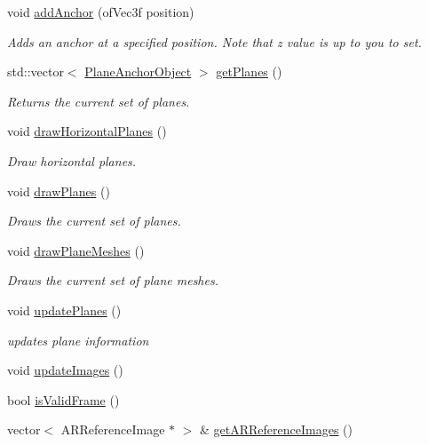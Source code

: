 \begin{DoxyCompactItemize}
void \mbox{\hyperlink{class_a_r_processor_af4e627093ee86883736c89c2a627af42}{add\+Anchor}} (of\+Vec3f position)
\begin{DoxyCompactList}\small\item\em Adds an anchor at a specified position. Note that z value is up to you to set. \end{DoxyCompactList}\item 
std\+::vector$<$ \mbox{\hyperlink{struct_a_r_objects_1_1_plane_anchor_object}{Plane\+Anchor\+Object}} $>$ \mbox{\hyperlink{class_a_r_processor_a7989d984ccedbb31b0299adfe1fb1ac4}{get\+Planes}} ()
\begin{DoxyCompactList}\small\item\em Returns the current set of planes. \end{DoxyCompactList}\item 
void \mbox{\hyperlink{class_a_r_processor_a6a61a7e03821410bc1a715fd32159662}{draw\+Horizontal\+Planes}} ()
\begin{DoxyCompactList}\small\item\em Draw horizontal planes. \end{DoxyCompactList}\item 
void \mbox{\hyperlink{class_a_r_processor_acb7b24b21a47b4f4aa9d4d2c07a60d56}{draw\+Planes}} ()
\begin{DoxyCompactList}\small\item\em Draws the current set of planes. \end{DoxyCompactList}\item 
void \mbox{\hyperlink{class_a_r_processor_a516f256cd561a6f572f8741a2dec9c25}{draw\+Plane\+Meshes}} ()
\begin{DoxyCompactList}\small\item\em Draws the current set of plane meshes. \end{DoxyCompactList}\item 
void \mbox{\hyperlink{class_a_r_processor_aaa1488d9082ec598fd4aeb5c5c43d999}{update\+Planes}} ()
\begin{DoxyCompactList}\small\item\em updates plane information \end{DoxyCompactList}\item 
void \mbox{\hyperlink{class_a_r_processor_a287729321790fb840cb27a49e65f68a8}{update\+Images}} ()
\item 
bool \mbox{\hyperlink{class_a_r_processor_a0ef0ae984393513e3d3417bf659e022a}{is\+Valid\+Frame}} ()
\item 
vector$<$ A\+R\+Reference\+Image $\ast$ $>$ \& \mbox{\hyperlink{class_a_r_processor_a07f2f86123829bee3b92115a0636855c}{get\+A\+R\+Reference\+Images}} ()

\end{DoxyCompactItemize}
